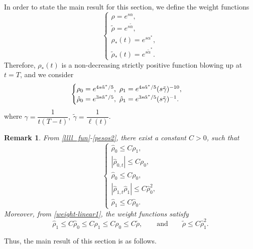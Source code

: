 \documentclass[11pt,a4paper]{amsart}
\numberwithin{equation}{section}
\newtheorem{remark}{Remark}[section]
\begin{document}
\noindent In order to state the main result for this section, we  define the weight functions
\begin{equation} \label{pesos}
\begin{cases}
    \rho = e^{s\alpha},\\
    \tilde{\rho}=e^{s\tilde{\alpha}},\\
    \rho_*(t) = e^{s\alpha^*},\\
  \tilde{\rho}_*(t) = e^{s\tilde{\alpha}^*}.
\end{cases}
\end{equation}Therefore, $\rho_*(t)$ is a non-decreasing strictly positive function blowing up at $t=T$, and we consider
\begin{equation} \label{pesos2}
\begin{cases}
    \rho_0 = e^{4s\tilde{\alpha}^{*}/5}, \, \, \rho_1 = e^{4s\tilde{\alpha}^{*}/5}(s\tilde{\gamma})^{-10},\\
    \Hat{\rho}_0 = e^{3s\tilde{\alpha}^{*}/5},\, \, \Hat{\rho}_1 = e^{3s\tilde{\alpha}^{*}/5}(s\tilde{\gamma})^{-1}.
\end{cases}
\end{equation}
where $\gamma=\dfrac{1}{t(T-t)},\ \tilde{\gamma}=\dfrac{1}{\ell(t)}$.
\begin{remark}
From \eqref{llll_fun}-\eqref{pesos2}, there exist a constant $C>0$, such that
\begin{equation}\label{weight-linear1}
\begin{cases}
 \hat{\rho}_{0}\leq C \rho_{1},\\ 
 |\hat{\rho}_{0,t}|\leq C \rho_{0},\\ 
 \hat{\rho}_{0}\leq C \rho_{0}, \\   
 |\hat{\rho}_{1,t}\hat{\rho}_{1}|\leq C \hat{\rho}^{2}_{0},\\
 \hat{\rho}_{1}\leq C\hat{\rho}_{0}.
\end{cases}
\end{equation}Moreover, from \eqref{weight-linear1}, the weight functions satisfy
\begin{equation}\label{eq:compara_rhos3}
	\hat\rho_1 \leq C\hat\rho_0 \leq  C\rho_{1}\leq C\rho_{0}\leq C\tilde \rho, \qquad %
    \text{and} \qquad \tilde \rho \leq C \hat\rho_1^2.   
\end{equation}

\end{remark}



Thus, the main result of this section is as follows.
\end{document}
